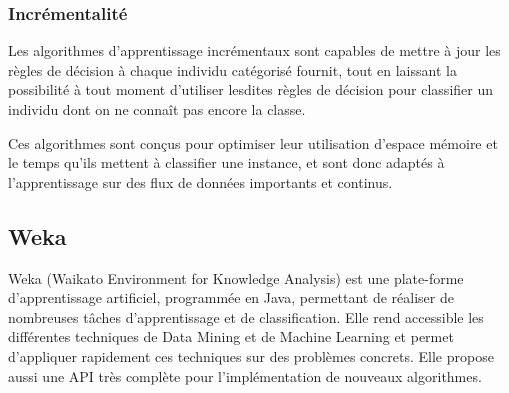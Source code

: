         \subsubsection{Incrémentalité}

            Les algorithmes d’apprentissage incrémentaux sont capables de mettre à jour les règles de décision à chaque individu catégorisé fournit, tout en laissant la possibilité à tout moment d’utiliser lesdites règles de décision pour classifier un individu dont on ne connaît pas encore la classe.

            Ces algorithmes sont conçus pour optimiser leur utilisation d'espace mémoire et le temps qu'ils mettent à classifier une instance, et sont donc adaptés à l'apprentissage sur des flux de données importants et continus.

    \subsection{Weka}

        Weka (Waikato Environment for Knowledge Analysis) est une plate-forme d'apprentissage artificiel, programmée en Java, permettant de réaliser de nombreuses tâches d’apprentissage et de classification. Elle rend accessible les différentes techniques de Data Mining et de Machine Learning et  permet d’appliquer rapidement ces techniques sur des problèmes concrets. Elle propose aussi une API très complète pour l'implémentation de nouveaux algorithmes.
